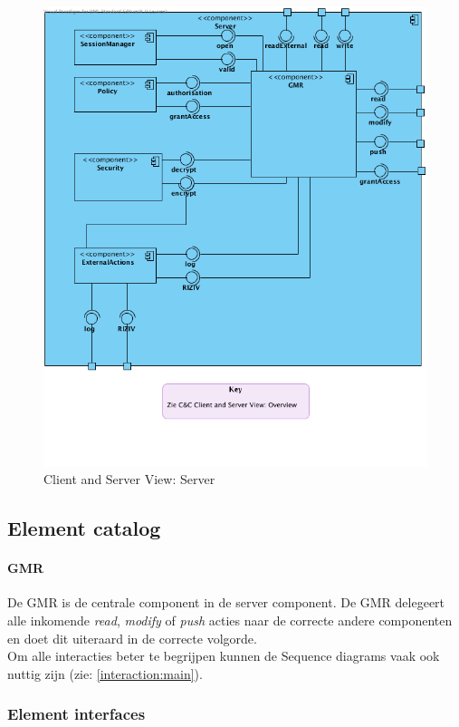 \documentclass[a4paper,10pt]{article}
\begin{document}
\begin{figure}[!ht]
  \includegraphics[scale=0.60]{../images/ClientServer_Server.png}
  \caption{Client and Server View: Server}
\end{figure}

\subsection{Element catalog}

\paragraph{GMR}
De GMR is de centrale component in de server component.  De GMR delegeert alle inkomende \textit{read}, \textit{modify} of \textit{push} acties naar de correcte andere componenten en doet dit uiteraard in de correcte volgorde.\\
Om alle interacties beter te begrijpen kunnen de Sequence diagrams vaak ook nuttig zijn (zie: \ref{interaction:main}).

\subsubsection{Element interfaces} 
\end{document}
